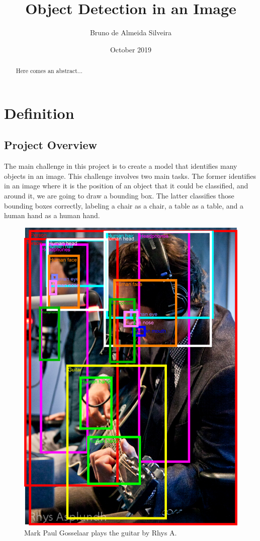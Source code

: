 \documentclass[11pt, a4paper, onecolumn]{article}
\title{\textbf{Object Detection in an Image}}
\author{Bruno de Almeida Silveira}
\date{October 2019}
\begin{document}
\begin{titlingpage}
	\maketitle
	\begin{abstract}
		Here comes an abstract...
	\end{abstract}
\end{titlingpage}

\section{Definition}
\subsection{Project Overview}
The main challenge in this project is to create a model that identifies many objects in an image. This challenge involves two main tasks. The former identifies in an image where it is the position of an object that it could be classified, and around it, we are going to draw a bounding box. The latter classifies those bounding boxes correctly, labeling a chair as a chair, a table as a table, and a human hand as a human hand.

\begin{figure}[ht]
	\centering
	\includegraphics[width=.7\textwidth]{intro-1.png}
	\caption{\scriptsize Mark Paul Gosselaar plays the guitar by Rhys A. \cite{google:1}}
\end{figure}
\end{document}
